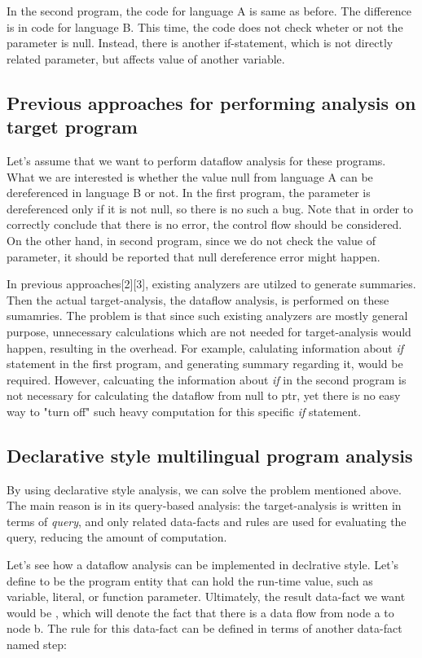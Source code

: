 In the second program, the code for language A is same as before. The
difference is in code for language B. This time, the code does not check wheter
or not the parameter is null. Instead, there is another if-statement, which is
not directly related parameter, but affects value of another variable.

\subsection{Previous approaches for performing analysis on target program}

Let's assume that we want to perform dataflow analysis for these programs.
What we are interested is whether the value null from language A can be
dereferenced in language B or not. In the first program, the parameter is
dereferenced only if it is not null, so there is no such a bug. Note that in
order to correctly conclude that there is no error, the control flow should be
considered. On the other hand, in second program, since we do not check the
value of parameter, it should be reported that null dereference error might
happen.

In previous approaches[2][3], existing analyzers are utilzed to generate
summaries. Then the actual target-analysis, the dataflow analysis, is performed
on these sumamries. The problem is that since such existing analyzers are
mostly general purpose, unnecessary calculations which are not needed for
target-analysis would happen, resulting in the overhead. For example,
calulating information about \textit{if} statement in the first program, and
generating summary regarding it, would be required. However, calcuating the
information about \textit{if} in the second program is not necessary for
calculating the dataflow from null to ptr, yet there is no easy way to "turn
off" such heavy computation for this specific \textit{if} statement.

\subsection{Declarative style multilingual program analysis}

By using declarative style analysis, we can solve the problem mentioned above.
The main reason is in its query-based analysis: the target-analysis is
written in terms of \textit{query}, and only related data-facts and rules
are used for evaluating the query, reducing the amount of computation.

Let's see how a dataflow analysis can be implemented in declrative style.
Let's define  to be the program entity that can hold the run-time
value, such as variable, literal, or function parameter.  Ultimately, the
result data-fact we want would be , which will denote the
fact that there is a data flow from node a to node b. The rule for this
data-fact can be defined in terms of another data-fact named step:


